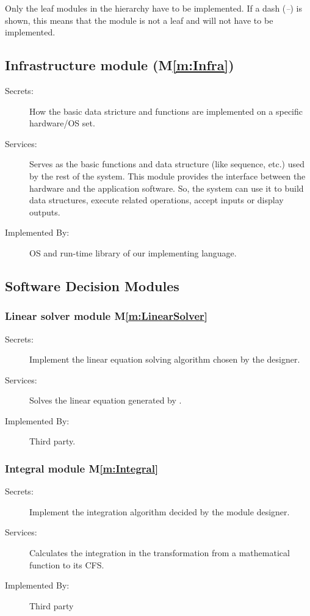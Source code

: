 \documentclass[12pt, titlepage]{article}
\newcommand{\mref}[1]{M\ref{m:#1}}
\begin{document}
Only the leaf modules in the hierarchy have to be implemented. If a dash
(\emph{--}) is shown, this means that the module is not a leaf and will not have
to be implemented.

\subsection{Infrastructure module (\mref{Infra})}

\begin{description}
\item[Secrets:]How the basic data stricture and functions are implemented on a specific hardware/OS set.
\item[Services:]Serves as the basic functions and data structure (like sequence, etc.) used by the rest of the system. This module provides the interface between the hardware and the application software. So, the system can use it to build data structures, execute related operations, accept inputs or display outputs.
\item[Implemented By:] OS and run-time library of our implementing language.
\end{description}
\subsection{Software Decision Modules}
\subsubsection{Linear solver module \mref{LinearSolver}}

\begin{description}
\item[Secrets:]Implement the linear equation solving algorithm chosen by the designer.
\item[Services:]Solves the linear equation generated by \progname.
\item[Implemented By:] Third party.
\end{description}
\subsubsection{Integral module \mref{Integral}}

\begin{description}
	\item[Secrets:]Implement the integration algorithm decided by the module designer.
	\item[Services:]Calculates the integration in the transformation from a mathematical function to its CFS.
	\item[Implemented By:] Third party
\end{description}
\end{document}
